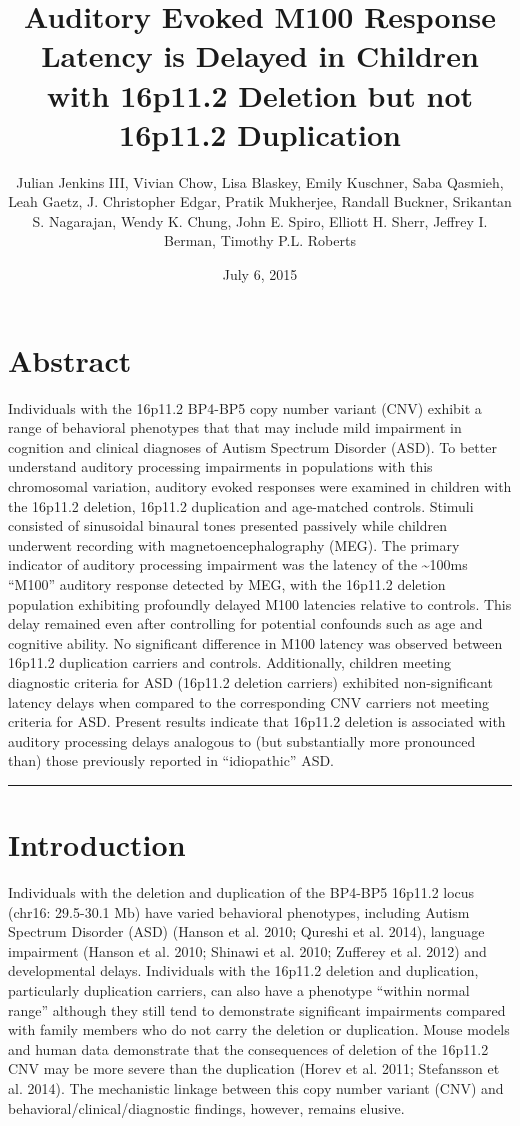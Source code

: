 \documentclass[]{article}
\title{Auditory Evoked M100 Response Latency is Delayed in Children with
16p11.2 Deletion but not 16p11.2 Duplication}
\author{Julian Jenkins III, Vivian Chow, Lisa Blaskey, Emily Kuschner, Saba
Qasmieh, Leah Gaetz, J. Christopher Edgar, Pratik Mukherjee, Randall
Buckner, Srikantan S. Nagarajan, Wendy K. Chung, John E. Spiro, Elliott
H. Sherr, Jeffrey I. Berman, Timothy P.L. Roberts}
\date{July 6, 2015}
\begin{document}
\maketitle


{
\hypersetup{linkcolor=black}
\setcounter{tocdepth}{2}
\tableofcontents
}
\section{Abstract}\label{abstract}

Individuals with the 16p11.2 BP4-BP5 copy number variant (CNV) exhibit a
range of behavioral phenotypes that that may include mild impairment in
cognition and clinical diagnoses of Autism Spectrum Disorder (ASD). To
better understand auditory processing impairments in populations with
this chromosomal variation, auditory evoked responses were examined in
children with the 16p11.2 deletion, 16p11.2 duplication and age-matched
controls. Stimuli consisted of sinusoidal binaural tones presented
passively while children underwent recording with magnetoencephalography
(MEG). The primary indicator of auditory processing impairment was the
latency of the \textasciitilde{}100ms ``M100'' auditory response
detected by MEG, with the 16p11.2 deletion population exhibiting
profoundly delayed M100 latencies relative to controls. This delay
remained even after controlling for potential confounds such as age and
cognitive ability. No significant difference in M100 latency was
observed between 16p11.2 duplication carriers and controls.
Additionally, children meeting diagnostic criteria for ASD (16p11.2
deletion carriers) exhibited non-significant latency delays when
compared to the corresponding CNV carriers not meeting criteria for ASD.
Present results indicate that 16p11.2 deletion is associated with
auditory processing delays analogous to (but substantially more
pronounced than) those previously reported in ``idiopathic'' ASD.

\begin{center}\rule{0.5\linewidth}{\linethickness}\end{center}

\section{Introduction}\label{introduction}

Individuals with the deletion and duplication of the BP4-BP5 16p11.2
locus (chr16: 29.5-30.1 Mb) have varied behavioral phenotypes, including
Autism Spectrum Disorder (ASD) (Hanson et al. 2010; Qureshi et al.
2014), language impairment (Hanson et al. 2010; Shinawi et al. 2010;
Zufferey et al. 2012) and developmental delays. Individuals with the
16p11.2 deletion and duplication, particularly duplication carriers, can
also have a phenotype ``within normal range'' although they still tend
to demonstrate significant impairments compared with family members who
do not carry the deletion or duplication. Mouse models and human data
demonstrate that the consequences of deletion of the 16p11.2 CNV may be
more severe than the duplication (Horev et al. 2011; Stefansson et al.
2014). The mechanistic linkage between this copy number variant (CNV)
and behavioral/clinical/diagnostic findings, however, remains elusive.
\end{document}

